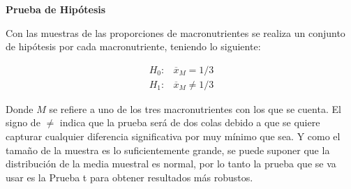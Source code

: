 \documentclass[12pt,a4paper]{article}
\begin{document}
        \textbf{Prueba de Hipótesis}\\ 
        {
            Con las muestras de las proporciones de macronutrientes se realiza 
            un conjunto de hipótesis por cada macronutriente, teniendo lo 
            siguiente:

            \begin{align*}
                H_0 :& \overline{x}_M = 1/3  \\
                H_1 :& \overline{x}_M \ne 1/3 
            \end{align*}
        
            Donde $M$ se refiere a uno de los tres macronutrientes con los que 
            se cuenta. El signo de $\ne$ indica que la prueba será de dos colas 
            debido a que se quiere capturar cualquier diferencia significativa 
            por muy mínimo que sea. Y como el tamaño de la muestra es lo suficientemente 
            grande, se puede suponer que la distribución de la media muestral es 
            normal, por lo tanto la prueba que se va usar es la Prueba t para obtener 
            resultados más robustos.\\
        }
\end{document}
